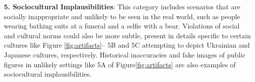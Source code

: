 \textbf{5. Sociocultural Implausibilities}: This category includes scenarios that are socially inappropriate and unlikely to be seen in the real world, such as people wearing bathing suits at a funeral and a selfie with a bear. Violations of social and cultural norms could also be more subtle, present in details specific to certain cultures like Figure \ref{fig:artifacts}-- 5B and 5C attempting to depict Ukrainian and Japanese cultures, respectively. Historical inaccuracies and fake images of public figures in unlikely settings like 5A of Figure\ref{fig:artifacts} are also examples of sociocultural implausibilities.

